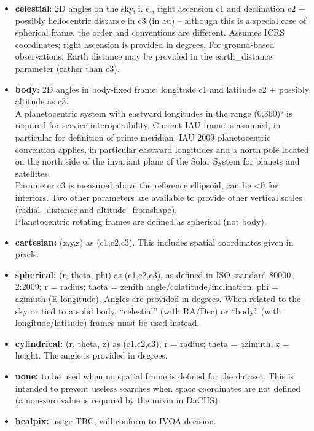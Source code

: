 \documentclass[11pt,a4paper]{ivoa}
\begin{document}
\begin{itemize}

\item \textbf{celestial}: 2D angles on the sky, i. e., right ascension c1 and declination c2 + possibly heliocentric distance in c3 (in au) – although this is a special case of spherical frame, the order and conventions are different. Assumes ICRS coordinates; right ascension is provided in degrees. For ground-based observations, Earth distance may be provided in the earth\_distance parameter (rather than c3). 

\item \textbf{body}: 2D angles in body-fixed frame: longitude c1 and latitude c2 + possibly altitude as c3. \\A planetocentric system with eastward longitudes in the range (0,360)° is required for service interoperability. Current IAU frame is assumed, in particular for definition of prime meridian. IAU 2009 planetocentric convention applies, in particular eastward longitudes and a north pole located on the north side of the invariant plane of the Solar System for planets and satellites.  \\Parameter c3 is measured above the reference ellipsoid, can be <0 for interiors. Two other parameters are available to provide other vertical scales (radial\_distance and altitude\_fromshape). \\Planetocentric rotating frames are defined as spherical (not body).

\item \textbf{cartesian:} (x,y,z) as (c1,c2,c3). This includes spatial coordinates given in pixels.

\item \textbf{spherical:} (r, theta, phi) as (c1,c2,c3), as defined in ISO standard 80000-2:2009; r = radius; theta = zenith angle/colatitude/inclination; phi = azimuth (E longitude). Angles are provided in degrees. When related to the sky or tied to a solid body, ``celestial'' (with RA/Dec) or ``body'' (with longitude/latitude) frames must be used instead.

\item \textbf{cylindrical:} (r, theta, z) as (c1,c2,c3); r = radius; theta = azimuth; z = height. The angle is provided in degrees.

\item \textbf{none:} to be used when no spatial frame is defined for the dataset. This is intended to prevent useless searches when space coordinates are not defined (a non-zero value is required by the mixin in DaCHS).

\item \textbf{healpix:} usage TBC, will conform to IVOA decision.

\end{itemize}
\end{document}
